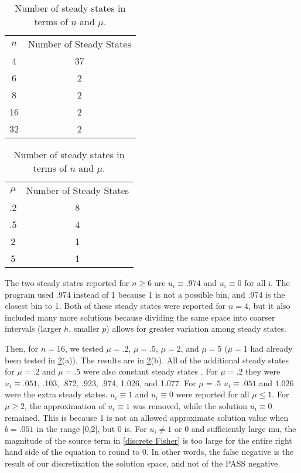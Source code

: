 \documentclass[11pt]{article}
\newcommand{\bhline}{\Xhline{2\arrayrulewidth}}
\begin{document}
\begin{table}
\begin{center}

\begin{tabular}{ | c | c | }
\hline
$n$ & Number of Steady States \\
\bhline
4 & 37 \\
\hline
6 & 2 \\
\hline
8 & 2 \\ 
\hline
16 & 2 \\
\hline
32 & 2 \\
\hline
\end{tabular}
\hspace{.5in}
\begin{tabular}{ | c | c | }
\hline
$\mu$ & Number of Steady States \\
\bhline
.2 & 8 \\
\hline
.5 & 4 \\ 
\hline
2 & 1 \\ %
\hline
5 & 1 \\
\hline
\end{tabular}

\caption{Number of steady states in terms of $n$ and $\mu$.}
\label{Fisher Statistics}
\end{center}
\end{table}

The two steady states reported for $n \ge 6$ are $u_i \equiv .974$ and $u_i \equiv 0$ for all i. The program used .974 instead of 1 because 1 is not a possible bin, and $.974$ is the closest bin to 1. Both of these steady states were reported for $n = 4$, but it also included many more solutions because dividing the same space into coarser intervals (larger $h$, smaller $p$) allows for greater variation among steady states.

Then, for $n = 16$, we tested $\mu = .2$, $\mu = .5$, $\mu = 2$, and $\mu = 5$ ($\mu = 1$ had already been tested in \cref{Fisher Statistics}(a)). The results are in \cref{Fisher Statistics}(b). All of the additional steady states for $\mu = .2$ and $\mu = .5$ were also constant steady states . For $\mu = .2$ they were $u_i \equiv .051$, .103, .872, .923, .974, 1.026, and 1.077. For $\mu = .5$ $u_i \equiv .051$ and $1.026$ were the extra steady states. $u_i \equiv 1$ and $u_i \equiv 0$ were reported for all $\mu \le 1$. For $\mu \ge 2$, the approximation of $u_i \equiv 1$ was removed, while the solution $u_i \equiv 0$ remained. This is because 1 is not an allowed approximate solution value when $b = .051$ in the range [0,2], but 0 is. For $u_i \ne 1$ or $0$ and sufficiently large mu, the magnitude of the source term in \cref{discrete Fisher} is too large for the entire right hand side of the equation to round to 0. In other words, the false negative is the result of our discretization the solution space, and not of the PASS negative.
\end{document}
